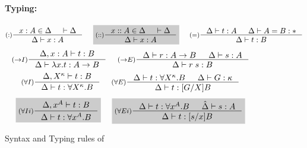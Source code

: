 \begin{figure}
\begin{framed}
\paragraph{Typing:}
\[ \inference[($:$)]{x:A \in \Delta & |- \Delta} 
                    {\Delta |- x:A}
 ~~~~ \newFi{
   \inference[($::$)]{x::A \in \Delta & |- \Delta} 
                     {\Delta |- x:A} }
 ~~~~
   \inference[($=$)]{\Delta |- t :A & \Delta |- A = B : *}
                    {\Delta |- t : B}
\]
\[
   \inference[($->$$I$)]{\Delta, x:A |- t : B}
                        {\Delta |- \lambda x.t : A -> B}
 ~~~~
   \inference[($->$$E$)]{\Delta |- r : A -> B & \Delta |- s : A}
                        {\Delta |- r\;s : B}
\]
\[ \inference[($\forall I$)]{\Delta, X^\kappa |- t : B}
                            {\Delta |- t : \forall X^\kappa.B}
 ~~~~
   \inference[($\forall E$)]{ \Delta |- t : \forall X^\kappa.B
                            & \Delta |- G:\kappa }
                            {\Delta |- t : [G/X]B}
\]
\[ \newFi{
   \inference[($\forall I i$)]{\Delta, x^A |- t : B}
                              {\Delta |- t : \forall x^A.B} }
 ~~~~ \newFi{
   \inference[($\forall E i$)]{\Delta |- t : \forall x^A.B & \hat\Delta |- s:A}
                              {\Delta |- t : [s/x]B} }
\]
\end{framed}
\caption{Syntax and Typing rules of \Fi}
\label{fig:Fi}
\end{figure}

